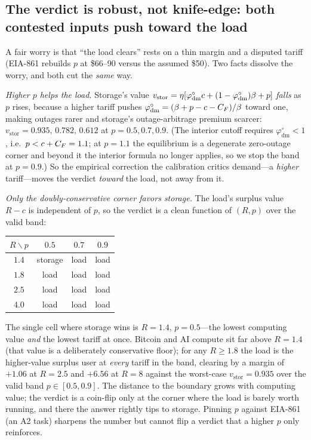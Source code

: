 \documentclass[11pt,reqno]{amsart}
\theoremstyle{plain}\newtheorem{proposition}{Proposition}\newtheorem{corollary}[proposition]{Corollary}
\theoremstyle{remark}\newtheorem{remark}[proposition]{Remark}
\newcommand{\phio}{\varphi^{\circ}}
\begin{document}
\subsection*{The verdict is robust, not knife-edge: both contested inputs push toward the load}
A fair worry is that ``the load clears'' rests on a thin margin and a disputed tariff (EIA-861
rebuilds $p$ at \$66--90 versus the assumed \$50). Two facts dissolve the worry, and both cut
the \emph{same} way.

\emph{Higher $p$ helps the load.} Storage's value $v_{\mathrm{stor}}=\eta[\phio_{\mathrm{dm}}c+(1-\phio_{\mathrm{dm}})\bp]$
\emph{falls} as $p$ rises, because a higher tariff pushes $\phio_{\mathrm{dm}}=(\bp-c-\CF)/\beta$
toward one, making outages rarer and storage's outage-arbitrage premium scarcer:
$v_{\mathrm{stor}}=0.935,\,0.782,\,0.612$ at $p=0.5,0.7,0.9$. (The interior cutoff requires
$\phio_{\mathrm{dm}}<1$, i.e.\ $p<c+C_F=1.1$; at $p=1.1$ the equilibrium is a degenerate
zero-outage corner and beyond it the interior formula no longer applies, so we stop the band
at $p=0.9$.) So the empirical correction the calibration critics demand---a \emph{higher}
tariff---moves the verdict \emph{toward} the load, not away from it.

\emph{Only the doubly-conservative corner favors storage.} The load's surplus value $R-c$ is
independent of $p$, so the verdict is a clean function of $(R,p)$ over the valid band:
\begin{center}\small
\begin{tabular}{c|ccc}
\toprule
$R\backslash p$ & $0.5$ & $0.7$ & $0.9$\\
\midrule
$1.4$ & storage & load & load\\
$1.8$ & load & load & load\\
$2.5$ & load & load & load\\
$4.0$ & load & load & load\\
\bottomrule
\end{tabular}
\end{center}
The single cell where storage wins is $R=1.4,\,p=0.5$---the lowest computing value
\emph{and} the lowest tariff at once. Bitcoin and AI compute sit far above $R=1.4$ (that value
is a deliberately conservative floor); for any $R\ge1.8$ the load is the higher-value surplus
user at \emph{every} tariff in the band, clearing by a margin of $+1.06$ at $R=2.5$ and $+6.56$
at $R=8$ against the worst-case $v_{\mathrm{stor}}=0.935$ over the valid band $p\in[0.5,0.9]$. The distance to the
boundary grows with computing value; the verdict is a coin-flip only at the corner where the
load is barely worth running, and there the answer rightly tips to storage. Pinning $p$
against EIA-861 (an A2 task) sharpens the number but cannot flip a verdict that a higher $p$
only reinforces.
\end{document}
